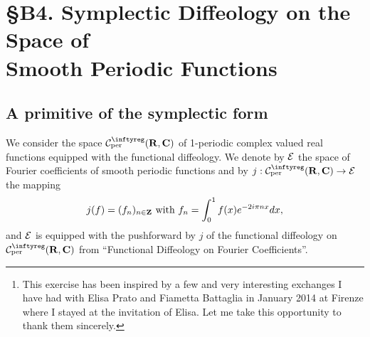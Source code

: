 
\chapter*{\S B4. Symplectic Diffeology on the Space of \\ Smooth Periodic Functions}
\setcounter{footnote}{0}

\begin{abstract}
  We consider a symplectic structure on the space of smooth periodic functions and the action of the infinite torus
  as we have seen in previous notes ``Functional Diffeology on Fourier Coefficients'' and ``Infinite Torus Action on Smooth Periodic Functions''.
  We study the action of the irrational solenoid and we show a reduction process for its moment map levels,
  extending a diffeological version of Elisa Prato's quasispheres construction \cite{EP01} to infinite dimension,%
  \footnote{This exercise has been inspired by a few and very interesting exchanges I have had with Elisa Prato and Fiametta Battaglia in January 2014 at Firenze where I stayed at the invitation of Elisa.
  Let me take this opportunity to thank them sincerely.}
  using the diffeology tools.
\end{abstract}

\section{A primitive of the symplectic form}

We consider the space $\Cinfty_{\rm per}(\RR,\CC)$ of 1-periodic complex valued real functions
equipped with the functional diffeology. We denote by $\mathcal{E}$ the space of Fourier coefficients of
smooth periodic functions and by $j : \Cinfty_{\rm per}(\RR,\CC) \to \cE$ the mapping
$$
  j(f) = (f_n)_{n\in \mathbf{Z}} \ \text{with}\  f_n = \int_0^1 f(x)e^{-2i\pi n x}dx,
  $$
and $\mathcal{E}$ is equipped with the pushforward by $j$ of the functional diffeology on $\Cinfty_{\rm per}(\RR,\CC)$ from ``Functional Diffeology on Fourier Coefficients''.

